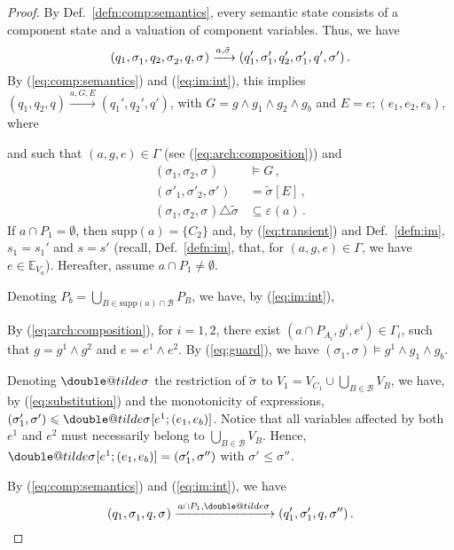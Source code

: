 \documentclass{llncs}
\makeatletter
\newcommand{\defn}[1]{Def.~\ref{defn:#1}}
\newcommand{\eq}[1]{(\ref{eq:#1})}
\newcommand{\cB}{\ensuremath{\mathcal{B}}}
\newcommand{\sE}{\ensuremath{\mathbb{E}}}
\newcommand{\goesto}[2][]{\ensuremath{\xrightarrow[#1]{#2}}}
\newcommand{\exprs}[1]{\ensuremath{\sE_{#1}}}
\newcommand{\val}[3][]{%
  \ensuremath{#1{\sigma}^{#2}_{#3}}%
}
\newcommand{\primeit}[1]{#1'}
\newcommand{\doubleprimeit}[1]{#1''}
\newcommand{\export}[1][]{\ensuremath{\varepsilon_{#1}}}
\newcommand{\valdiff}[2]{\ensuremath{#1 \triangle #2}}
\newcommand{\supp}[1]{\ensuremath{\mathrm{supp}(#1)}}
\newcommand{\order}{\leqslant}
\newcommand{\doubletilde}[1]{{%
  \mathpalette\double@tilde{#1}%
}}
\newcommand{\double@tilde}[2]{%
  \sbox\z@{$\m@th#1\tilde{#2}$}%
  \ht\z@=.9\ht\z@
  \tilde{\box\z@}%
}
\makeatother
\begin{document}
\begin{proof}
  By \defn{comp:semantics}, every semantic state consists of a
  component state and a valuation of component variables.  Thus,
  we have
%
  \[
  (q_1, \val{}{1}, q_2, \val{}{2}, q, \val{}{})
%
  \goesto{a, \tilde{\val{}{}}}
%
  (q_1', \val[\primeit]{}{1}, q_2', \val[\primeit]{}{1}, q', \val[\primeit]{}{})
  \,.
  \]
%
  By \eq{comp:semantics} and \eq{im:int}, this implies
  $(q_1, q_2, q) \goesto {a, G, E} (q_1', q_2', q')$, with
%
  $G = g \land g_1 \land g_2 \land g_b$
  and
  $E = e; (e_1, e_2, e_b)$,
  where
%    
%
  and such that $(a, g, e) \in \Gamma$ (see
  \eq{arch:composition}) and
%
  \begin{align}
    \label{eq:guard}
    (\val{}{1}, \val{}{2}, \val{}{}) &\models G
    \,,
    \\
    \label{eq:substitution}
    (\val[\primeit]{}{1}, \val[\primeit]{}{2}, \val[\primeit]{}{})
    &= \val[\tilde]{}{}[E]
    \,,
    \\
    \label{eq:transient}
    \valdiff{(\val{}{1}, \val{}{2}, \val{}{})}{\val[\tilde]{}{}}
    &\subseteq \export(a)
    \,.
  \end{align}
%
  If $a \cap P_1 = \emptyset$, then $\supp{a} = \{C_2\}$ and, by
  \eq{transient} and \defn{im}, $s_1 = s_1'$ and $s = s'$
  (recall, \defn{im}, that, for $(a,g,e) \in \Gamma$, we have $e
  \in \exprs{V_a}$).  Hereafter, assume $a \cap P_1 \neq
  \emptyset$.

  Denoting $P_b = \bigcup_{B \in \supp{a} \cap \cB} P_B$, we
  have, by \eq{im:int},
%
 
  By \eq{arch:composition}, for $i=1,2$, there exist
  $(a \cap P_{A_i}, g^i, e^i) \in \Gamma_i$,
  such that $g = g^1 \land g^2$ and $e = e^1 \land e^2$.
  By \eq{guard}, we have
  $(\val{}{1}, \val{}{}) \models g^1 \land g_1 \land g_b$.

  Denoting $\val[\doubletilde]{}{}$ the restriction of
%
  $\val[\tilde]{}{}$ to
  $V_1 = V_{C_1} \cup \bigcup_{B \in \cB} V_B$,
%
  we have, by \eq{substitution} and the monotonicity of
  expressions,
%
  $(\val[\primeit]{}{1}, \val[\primeit]{}{}) \order
  \val[\doubletilde]{}{}[e^1; (e_1, e_b)]$.  Notice that all
  variables affected by both $e^1$ and $e^2$ must necessarily
  belong to $\bigcup_{B \in \cB} V_B$.  Hence,
%
  $\val[\doubletilde]{}{}[e^1; (e_1, e_b)] =
  (\val[\primeit]{}{1}, \val[\doubleprimeit]{}{})$ with 
  $\val[\primeit]{}{} \order \val[\doubleprimeit]{}{}$.

  By \eq{comp:semantics} and \eq{im:int}, we have
  \[
  (q_1, \val{}{1}, q, \val{}{})
  \goesto{a \cap P_1, \val[\doubletilde]{}{}}
  (q_1', \val[\primeit]{}{1}, q, \val[\doubleprimeit]{}{})
  \,.
  \]
\end{proof}
\end{document}
